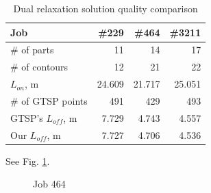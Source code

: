 \documentclass{ifacconf}
\begin{document}
\begin{table}[h]
  \begin{center}
  \begin{tabular}{l|*{3}{r}}
      Job & \#229 & \#464 & \#3211 \\
      \hline
      \# of parts & 11 & 14 & 17\\
      \# of contours & 12 & 21 & 22 \\
      $L_{on}$, m & 24.609 & 21.717 & 25.051 \\
      \# of GTSP points & 491 & 429 & 493 \\
      GTSP's $L_{off}$, m & 7.729 & 4.743 & 4.557 \\
      Our $L_{off}$, m & 7.727 & 4.706 & 4.536 \\
  \end{tabular}
  \caption{Dual relaxation solution quality comparison}
  \label{exact-3}
  \end{center}
\end{table}

See Fig. \ref{quality}.

\begin{figure}
    \begin{center}
    \caption{Job 464}
    \label{quality}
    \end{center}
\end{figure}
\end{document}
